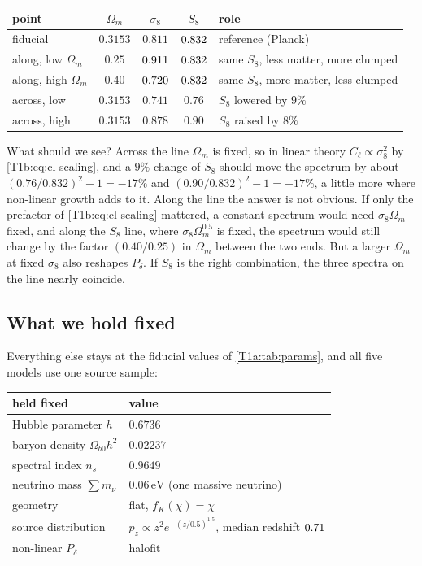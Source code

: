 \begin{center}
\small
\begin{tabular}{@{}lcccl@{}}
\toprule
point & $\Omega_m$ & $\sigma_8$ & $S_8$ & role\\\midrule
fiducial & $0.3153$ & $0.811$ & $0.832$ & reference (Planck)\\
along, low $\Omega_m$ & $0.25$ & $0.911$ & $0.832$ & same $S_8$, less matter, more clumped\\
along, high $\Omega_m$ & $0.40$ & $0.720$ & $0.832$ & same $S_8$, more matter, less clumped\\
across, low & $0.3153$ & $0.741$ & $0.76$ & $S_8$ lowered by $9\%$\\
across, high & $0.3153$ & $0.878$ & $0.90$ & $S_8$ raised by $8\%$\\
\bottomrule
\end{tabular}
\end{center}

What should we see? Across the line $\Omega_m$ is fixed, so in linear theory $C_\ell\propto\sigma_8^2$ by \eqref{T1b:eq:cl-scaling}, and a $9\%$ change of $S_8$ should move the spectrum by about $(0.76/0.832)^2-1=-17\%$ and $(0.90/0.832)^2-1=+17\%$, a little more where non-linear growth adds to it. Along the line the answer is not obvious. If only the prefactor of \eqref{T1b:eq:cl-scaling} mattered, a constant spectrum would need $\sigma_8\Omega_m$ fixed, and along the $S_8$ line, where $\sigma_8\Omega_m^{0.5}$ is fixed, the spectrum would still change by the factor $(0.40/0.25)$ in $\Omega_m$ between the two ends. But a larger $\Omega_m$ at fixed $\sigma_8$ also reshapes $P_\delta$. If $S_8$ is the right combination, the three spectra on the line nearly coincide.

\subsection{What we hold fixed}
\label{T1b:sec:s8-fixed}

Everything else stays at the fiducial values of \cref{T1a:tab:params}, and all five models use one source sample:

\begin{center}
\small
\begin{tabular}{@{}ll@{}}
\toprule
held fixed & value\\\midrule
Hubble parameter $h$ & $0.6736$\\
baryon density $\Omega_{b0}h^2$ & $0.02237$\\
spectral index $n_s$ & $0.9649$\\
neutrino mass $\sum m_\nu$ & $0.06\,\mathrm{eV}$ (one massive neutrino)\\
geometry & flat, $f_K(\chi)=\chi$\\
source distribution & $p_z\propto z^2e^{-(z/0.5)^{1.5}}$, median redshift $0.71$\\
non-linear $P_\delta$ & halofit \cite{Takahashi2012}\\
\bottomrule
\end{tabular}
\end{center}

